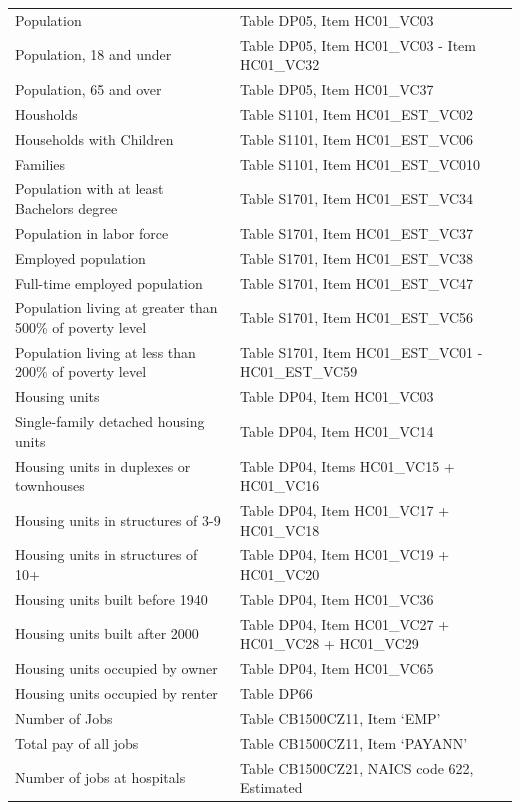 \documentclass[11pt]{article}
\begin{document}
\begin{appendices}
\begingroup
\fontsize{9}{9}\selectfont
\begin{tabular}{ll}
Population&Table DP05, Item HC01\_VC03\\
Population, 18 and under&Table DP05, Item HC01\_VC03 - Item HC01\_VC32\\
Population, 65 and over&Table DP05, Item HC01\_VC37\\
Housholds&Table S1101, Item HC01\_EST\_VC02\\
Households with Children&Table S1101, Item HC01\_EST\_VC06\\
Families&Table S1101, Item HC01\_EST\_VC010\\
Population with at least Bachelors degree&Table S1701, Item HC01\_EST\_VC34\\
Population in labor force&Table S1701, Item HC01\_EST\_VC37\\
Employed population&Table S1701, Item HC01\_EST\_VC38\\
Full-time employed population&Table S1701, Item HC01\_EST\_VC47\\
Population living at greater than 500\% of poverty level&Table S1701, Item HC01\_EST\_VC56\\
Population living at less than 200\% of poverty level&Table S1701, Item HC01\_EST\_VC01 -  HC01\_EST\_VC59\\
Housing units&Table DP04, Item HC01\_VC03\\
Single-family detached housing units&Table DP04, Item HC01\_VC14\\
Housing units in duplexes or townhouses&Table DP04, Items HC01\_VC15 + HC01\_VC16\\
Housing units in structures of 3-9&Table DP04, Item HC01\_VC17 + HC01\_VC18\\
Housing units in structures of 10+&Table DP04, Item HC01\_VC19 + HC01\_VC20\\
Housing units built before 1940&Table DP04, Item HC01\_VC36\\
Housing units built after 2000&Table DP04, Item HC01\_VC27 + HC01\_VC28 + HC01\_VC29\\
Housing units occupied by owner&Table DP04, Item HC01\_VC65\\
Housing units occupied by renter&Table DP66\\
Number of Jobs&Table CB1500CZ11, Item ‘EMP’\\
Total pay of all jobs&Table CB1500CZ11, Item ‘PAYANN’\\
Number of jobs at hospitals&Table CB1500CZ21, NAICS code 622, Estimated\\

\end{tabular}
\end{appendices}
\end{document}
